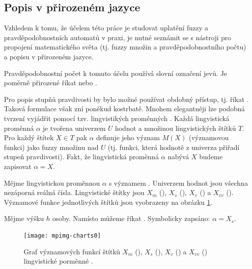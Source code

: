 \subsection{Popis v přirozeném jazyce}
Vzhledem k tomu, že účelem této práce je studovat uplatění fuzzy a pravděpodobnostních automatů v praxi, je nutné seznámit se s nástroji pro propojení matematického světa (tj. fuzzy množin a pravděpodobnostního počtu) a popisu v přirozeném jazyce.

Pravděpodobnostní počet k tomuto účelu používá slovní označení jevů. Je poměrně přirozené říkat  nebo .

Pro popis stupňů pravdivosti by bylo možné používat obdobný přístup, tj. říkat . Taková formulace však zní poněkud kostrbatě. Mnohem elegantněji lze podobná tvrzení vyjádřit pomocí tzv. lingvistikých proměnných \cite{Zad-ConLingVarAppApprRea}. Každá lingvistická proměnná $\alpha$ je tvořena univerzem $U$ hodnot a množinou lingvistických štítků $T$. Pro každý štítek $X \in T$ pak $\alpha$ definuje jeho význam $M(X)$ (významovou funkci) jako fuzzy množinu nad $U$ (tj. funkci, která hodnotě z univerza přiřadí stupeň pravdivosti). Fakt, že lingvistická proměnná $\alpha$ nabývá  $X$ budeme zapisovat $\alpha = X$.

\begin{example}
 Mějme lingvistickou proměnnou $\alpha$ s významem . Univerzem hodnot jsou všechna nezáporná reálná čísla. Lingvistické štítky jsou $X_m$ (), $X_s$ (), $X_v$ () a $X_{vv}$ (). Významové funkce jednotlivých štítků jsou vyobrazeny na obrázku \ref{fig:lingVarsMeansChart}.

 Mějme výšku $h$ osoby. Namísto  můžeme říkat . Symbolicky zapsáno: $\alpha = X_s$.
\end{example}

\begin{figure}
 \centering
 \texttt{[image: mpimg-charts0]}
 
 \caption[Graf významových funkcí štítků]{Graf významových funkcí štítků $X_m$ (), $X_s$ (), $X_v$ () a $X_{vv}$ () lingvistické porměnné .} \label{fig:lingVarsMeansChart}
\end{figure}

